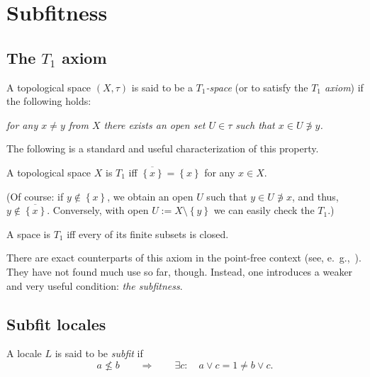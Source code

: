 \chapter{Subfitness}

\section{The $T_1$ axiom}

\begin{framed}
  \begin{df}[$T_1$]
    A topological space $(X, \tau)$ is said to be a \emph{$T_1$-space\/} (or to
    satisfy the \emph{$T_1$ axiom\/}) if the following holds:
    \begin{center} \it
      for any $x \ne y$ from $X$ there exists an open set $U\in \tau$ such that
      $x\in U \not\owns y$.
    \end{center}
  \end{df}
\end{framed}

The following is a standard and useful characterization of this property.

\begin{fact-num} \label{T1Char}
  A topological space $X$ is $T_1$ iff $\overline{\left\{x\right\}} =
  \left\{x\right\}$ for any $x\in X$.
\end{fact-num}

(Of course:
if $y\not\in \left\{x\right\}$, we obtain an open $U$ such that $y\in
U\not\owns x$, and thus, $y\not\in \overline{\left\{x\right\}}$.
Conversely, with open $U:= X\setminus \left\{y\right\}$ we can easily check the
$T_1$.)

\begin{cor}
  A space is $T_1$ iff every of its finite subsets is closed.
\end{cor}

There are exact counterparts of this axiom in the point-free context (see,
e.~g.,~\cite{ds72}).
They have not found much use so far, though.
Instead, one introduces a weaker and very useful condition: {\sl the
subfitness\/}.

\section{Subfit locales}

\begin{framed}
  \begin{df}[Sfit]
    A locale $L$ is said to be \emph{subfit\/} if
    \[
      a \not\le b \qquad \Rightarrow \qquad \exists c: \quad a \vee c = 1 \ne b
      \vee c.
    \]
  \end{df}
\end{framed}


